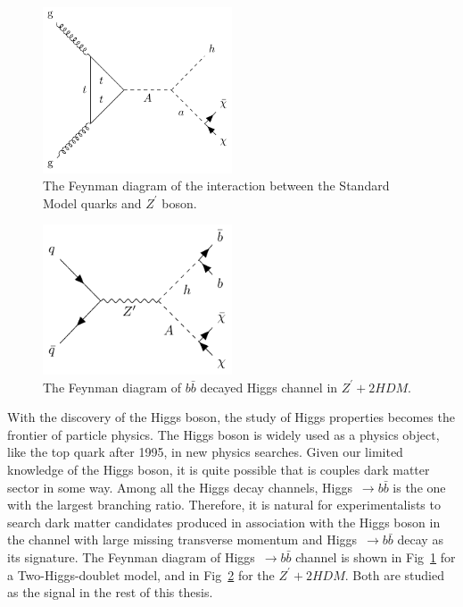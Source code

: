 \begin{figure}[htbp]
    \centering
    \includegraphics[width=0.5\textwidth]{chapters/c2/figures/two-higgs}
    \caption{The Feynman diagram of the interaction between the Standard Model quarks and $Z^{\prime}$ boson.}
    \label{fig:twohiggs}
\end{figure}

\begin{figure}[htbp]
    \centering
    \includegraphics[width=0.5\textwidth]{chapters/c2/figures/z-prime-2hdm}
    \caption{The Feynman diagram of $b\bar{b}$ decayed Higgs channel in $Z^{\prime}+2HDM$.}
    \label{fig:c2zprime2hdm}
\end{figure}


\par With the discovery of the Higgs boson, the study of Higgs properties becomes the frontier of particle physics. The Higgs boson is widely used as a physics object, like the top quark after 1995, in new physics searches. Given our limited knowledge of the Higgs boson, it is quite possible that is couples dark matter sector in some way. Among all the Higgs decay channels, Higgs~$\rightarrow b\bar{b}$ is the one with the largest branching ratio. Therefore, it is natural for experimentalists to search dark matter candidates produced in association with the Higgs boson in the channel with large missing transverse momentum and Higgs~$\rightarrow b\bar{b}$ decay as its signature. The Feynman diagram of Higgs~$\rightarrow b\bar{b}$ channel is shown in Fig~\ref{fig:twohiggs} for a Two-Higgs-doublet model, and in Fig~\ref{fig:c2zprime2hdm} for the $Z^{\prime}+2HDM$. Both are studied as the signal in the rest of this thesis.
